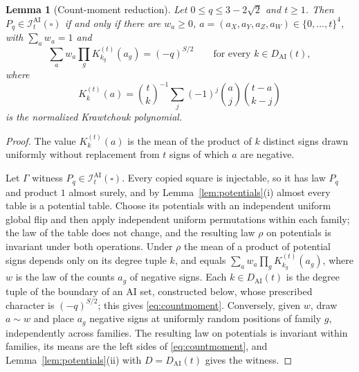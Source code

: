 \documentclass[11pt]{article}
\theoremstyle{plain}
\newtheorem{lemma}[theorem]{Lemma}
\theoremstyle{definition}
\newcommand{\IAI}{\mathcal I^{\mathrm{AI}}}
\begin{document}
\begin{lemma}[Count-moment reduction]\label{lem:countmoment}
Let $0\le q\le3-2\sqrt2$ and $t\ge1$. Then $P_q\in\IAI_t(\square)$ if and only if there are $w_a\ge0$, $a=(a_X,a_Y,a_Z,a_W)\in\{0,\dots,t\}^4$, with $\sum_aw_a=1$ and
\begin{equation}\label{eq:countmoment}
\sum_aw_a\prod_{g}K^{(t)}_{k_g}(a_g)=(-q)^{S/2}\qquad\text{for every }k\in D_{\mathrm{AI}}(t),
\end{equation}
where
\[
K^{(t)}_k(a)=\binom tk^{-1}\sum_j(-1)^j\binom aj\binom{t-a}{k-j}
\]
is the normalized Krawtchouk polynomial.
\end{lemma}

\begin{proof}
The value $K^{(t)}_k(a)$ is the mean of the product of $k$ distinct signs drawn uniformly without replacement from $t$ signs of which $a$ are negative.

Let $\Gamma$ witness $P_q\in\IAI_t(\square)$. Every copied square is injectable, so it has law $P_q$ and product $1$ almost surely, and by Lemma~\ref{lem:potentials}(i) almost every table is a potential table. Choose its potentials with an independent uniform global flip and then apply independent uniform permutations within each family; the law of the table does not change, and the resulting law $\rho$ on potentials is invariant under both operations. Under $\rho$ the mean of a product of potential signs depends only on its degree tuple $k$, and equals $\sum_aw_a\prod_gK^{(t)}_{k_g}(a_g)$, where $w$ is the law of the counts $a_g$ of negative signs. Each $k\in D_{\mathrm{AI}}(t)$ is the degree tuple of the boundary of an AI set, constructed below, whose prescribed character is $(-q)^{S/2}$; this gives \eqref{eq:countmoment}. Conversely, given $w$, draw $a\sim w$ and place $a_g$ negative signs at uniformly random positions of family $g$, independently across families. The resulting law on potentials is invariant within families, its means are the left sides of \eqref{eq:countmoment}, and Lemma~\ref{lem:potentials}(ii) with $D=D_{\mathrm{AI}}(t)$ gives the witness.


\end{proof}
\end{document}
